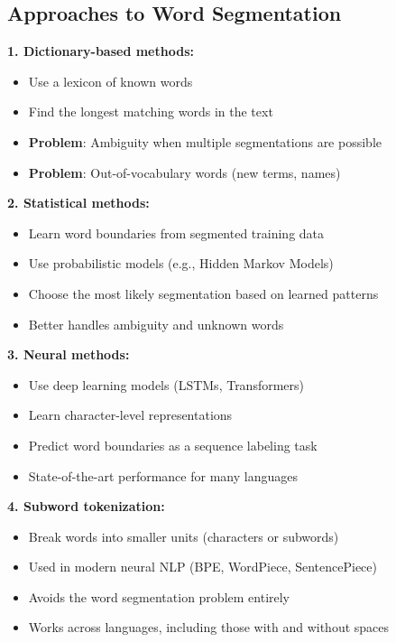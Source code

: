 \documentclass[11pt,a4paper]{article}
\theoremstyle{definition}
\theoremstyle{plain}
\theoremstyle{remark}
\begin{document}
\subsection{Approaches to Word Segmentation}

\textbf{1. Dictionary-based methods:}
\begin{itemize}
    \item Use a lexicon of known words
    \item Find the longest matching words in the text
    \item \textbf{Problem}: Ambiguity when multiple segmentations are possible
    \item \textbf{Problem}: Out-of-vocabulary words (new terms, names)
\end{itemize}

\textbf{2. Statistical methods:}
\begin{itemize}
    \item Learn word boundaries from segmented training data
    \item Use probabilistic models (e.g., Hidden Markov Models)
    \item Choose the most likely segmentation based on learned patterns
    \item Better handles ambiguity and unknown words
\end{itemize}

\textbf{3. Neural methods:}
\begin{itemize}
    \item Use deep learning models (LSTMs, Transformers)
    \item Learn character-level representations
    \item Predict word boundaries as a sequence labeling task
    \item State-of-the-art performance for many languages
\end{itemize}

\textbf{4. Subword tokenization:}
\begin{itemize}
    \item Break words into smaller units (characters or subwords)
    \item Used in modern neural NLP (BPE, WordPiece, SentencePiece)
    \item Avoids the word segmentation problem entirely
    \item Works across languages, including those with and without spaces
\end{itemize}
\end{document}
